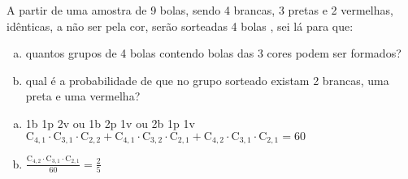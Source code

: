 \begin{ex}
 A partir de uma amostra de 9 bolas, sendo 4 brancas, 3 pretas e 2 vermelhas, idênticas, a não ser pela cor, serão sorteadas 4 bolas , sei lá para que:
    \begin{enumerate}[(a)]
    \item quantos grupos de 4 bolas contendo bolas das 3 cores podem ser formados?
    \item qual é a probabilidade de que no grupo sorteado existam 2 brancas, uma preta e uma vermelha?
    \end{enumerate}
      \begin{sol}
        \phantom{A} 
     \begin{enumerate} [(a)]
         \item 1b 1p 2v ou 1b 2p 1v ou 2b 1p 1v \\
         $\mathrm{C}_{4,1}\cdot\mathrm{C}_{3,1}\cdot\mathrm{C}_{2,2}+\mathrm{C}_{4,1}\cdot\mathrm{C}_{3,2}\cdot\mathrm{C}_{2,1}+\mathrm{C}_{4,2}\cdot\mathrm{C}_{3,1}\cdot\mathrm{C}_{2,1}=60$
         \item $\frac{\mathrm{C}_{4,2}\cdot\mathrm{C}_{3,1}\cdot\mathrm{C}_{2,1}}{60}=\frac{2}{5}$
              
     \end{enumerate}
      \end{sol}
\end{ex}
